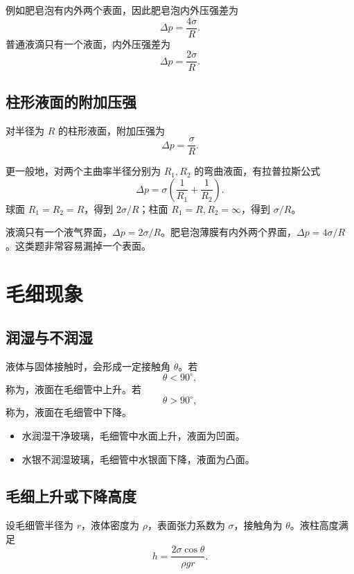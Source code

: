 例如肥皂泡有内外两个表面，因此肥皂泡内外压强差为
\[
  \boxed{
  \Delta p=\frac{4\sigma}{R}
  }.
\]
普通液滴只有一个液面，内外压强差为
\[
  \Delta p=\frac{2\sigma}{R}.
\]

\subsection{柱形液面的附加压强}

对半径为 \(R\) 的柱形液面，附加压强为
\[
  \boxed{
  \Delta p=\frac{\sigma}{R}
  }.
\]

更一般地，对两个主曲率半径分别为 \(R_1,R_2\) 的弯曲液面，有拉普拉斯公式
\[
  \boxed{
  \Delta p=\sigma\left(\frac{1}{R_1}+\frac{1}{R_2}\right)
  }.
\]
球面 \(R_1=R_2=R\)，得到 \(2\sigma/R\)；柱面 \(R_1=R,R_2=\infty\)，得到 \(\sigma/R\)。

\begin{WarnBox}
液滴只有一个液气界面，\(\Delta p=2\sigma/R\)。肥皂泡薄膜有内外两个界面，\(\Delta p=4\sigma/R\)。这类题非常容易漏掉一个表面。
\end{WarnBox}

\section{毛细现象}

\subsection{润湿与不润湿}

液体与固体接触时，会形成一定接触角 \(\theta\)。若
\[
  \theta<90^\circ,
\]
称为，液面在毛细管中上升。若
\[
  \theta>90^\circ,
\]
称为，液面在毛细管中下降。

\begin{KeyBox}[润湿判断]
\begin{itemize}
  \item 水润湿干净玻璃，毛细管中水面上升，液面为凹面。
  \item 水银不润湿玻璃，毛细管中水银面下降，液面为凸面。
\end{itemize}
\end{KeyBox}

\subsection{毛细上升或下降高度}

设毛细管半径为 \(r\)，液体密度为 \(\rho\)，表面张力系数为 \(\sigma\)，接触角为 \(\theta\)。液柱高度满足
\[
  \boxed{
  h=\frac{2\sigma\cos\theta}{\rho gr}
  }.
\]

